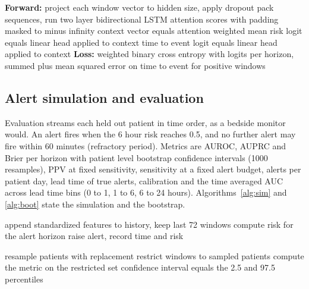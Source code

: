 \documentclass[11pt]{article}
\begin{document}
\begin{algorithm}[t]
\caption{FEAN forward pass and training loss}
\label{alg:fean}
\begin{algorithmic}[1]
\State \textbf{Forward:}
\State project each window vector to hidden size, apply dropout
\State pack sequences, run two layer bidirectional LSTM
\State attention scores with padding masked to minus infinity
\State context vector equals attention weighted mean
    \State risk logit equals linear head applied to context
\EndFor
\State time to event logit equals linear head applied to context
\State \textbf{Loss:}
\State weighted binary cross entropy with logits per horizon, summed
\State plus mean squared error on time to event for positive windows
\end{algorithmic}
\end{algorithm}

\subsection{Alert simulation and evaluation}
Evaluation streams each held out patient in time order, as a bedside monitor
would. An alert fires when the 6 hour risk reaches 0.5, and no further alert may
fire within 60 minutes (refractory period). Metrics are AUROC, AUPRC and Brier per
horizon with patient level bootstrap confidence intervals (1000 resamples), PPV at
fixed sensitivity, sensitivity at a fixed alert budget, alerts per patient day,
lead time of true alerts, calibration and the time averaged AUC across lead time
bins (0 to 1, 1 to 6, 6 to 24 hours). Algorithms~\ref{alg:sim} and
\ref{alg:boot} state the simulation and the bootstrap.

\begin{algorithm}[t]
\caption{Alert replay simulation}
\label{alg:sim}
\begin{algorithmic}[1]
    \State append standardized features to history, keep last 72 windows
    \State compute risk for the alert horizon
        \State raise alert, record time and risk
    \EndIf
\EndFor
\end{algorithmic}
\end{algorithm}

\begin{algorithm}[t]
\caption{Patient level bootstrap}
\label{alg:boot}
\begin{algorithmic}[1]
\Repeat
    \State resample patients with replacement
    \State restrict windows to sampled patients
        \State compute the metric on the restricted set
    \EndIf
{}
\State confidence interval equals the 2.5 and 97.5 percentiles
\end{algorithmic}
\end{algorithm}
\end{document}
